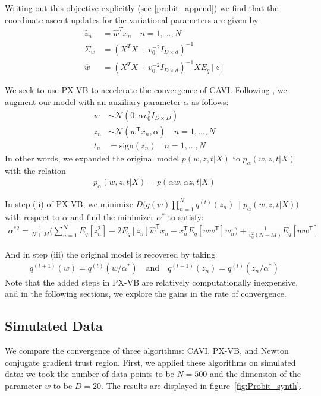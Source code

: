 \documentclass{article}
\begin{document}
Writing out this objective explicitly (see \ref{probit_append}) we find that the coordinate ascent updates for the variational parameters are given by 
\begin{align}
    \hat z_n &= \hat w^T x_n \quad n = 1, ..., N\\
    \Sigma_w &= (X^T X + v_0^{-2} I_{D\times d})^{-1}\\
    \hat w &= (X^T X + v_0^{-2} I_{D\times d})^{-1} XE_q[z]
\end{align}

We seek to use PX-VB to accelerate the convergence of CAVI. Following \cite{Qi}, we augment our model with an auxiliary parameter $\alpha$ as follows: 
\begin{align}
    w &\sim \mathcal N (0, \alpha v_0^2I_{D\times D}) \\
    z_n &\sim \mathcal N (w^\mathsf T x_n, \alpha)\quad n = 1, ..., N \\
    t_n &= \text{sign}(z_n) \quad n = 1, ..., N
\end{align}
In other words, we expanded the original model $p(w,z,t|X)$ to $p_\alpha(w,z,t|X)$ with the relation
\begin{align}
   p_\alpha(w,z,t|X) = p(\alpha w, \alpha z, t|X)
\end{align}

In step (ii) of PX-VB, we minimize $D\big(q(w) \prod_{n=1}^N q^{(t)}(z_n) \| p_\alpha(w,z,t|X) \big)$ with respect to $\alpha$ and find the minimizer $\alpha^*$ to satisfy: 
\begin{align}
    \alpha^{*2} = \frac{1}{N+M} \Big(\sum_{n=1}^N E_q[z_n^2] - 2E_q[z_n] \hat w^\mathsf Tx_n + x_n^\mathsf T E_q[w w^\mathsf T] w_n\Big) + \frac{1}{v_0^2(N+M)} E_q[w w^\mathsf T]
\end{align}

And in step (iii) the original model is recovered by taking
\begin{align}
    q^{(t+1)}(w) = q^{(t)}(w/\alpha^*) \quad \text{and} \quad q^{(t+1)}(z_n) = q^{(t)}(z_n/\alpha^*)
\end{align}
Note that the added steps in PX-VB are relatively computationally inexpensive, and in the following sections, we explore the gains in the rate of convergence. 

\subsection{Simulated Data}
We compare the convergence of three algorithms: CAVI, PX-VB, and Newton conjugate gradient trust region. First, we applied these algorithms on simulated data: we took the number of data points to be $N = 500$ and the dimension of the parameter $w$ to be $D= 20$. The results are displayed in figure~\ref{fig:Probit_synth}. 
\end{document}
